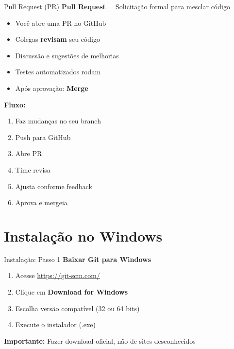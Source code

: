 \documentclass[11pt]{beamer}
\begin{document}
\begin{frame}{Pull Request (PR)}
\textbf{Pull Request} = Solicitação formal para mesclar código

\begin{itemize}
    \item Você abre uma PR no GitHub
    \item Colegas \textbf{revisam} seu código
    \item Discussão e sugestões de melhorias
    \item Testes automatizados rodam
    \item Após aprovação: \textbf{Merge}
\end{itemize}

\vspace{0.5cm}

\textbf{Fluxo:}
\begin{enumerate}
    \small
    \item Faz mudanças no seu branch
    \item Push para GitHub
    \item Abre PR
    \item Time revisa
    \item Ajusta conforme feedback
    \item Aprova e mergeia
\end{enumerate}
\end{frame}

\section{Instalação no Windows}

\begin{frame}{Instalação: Passo 1}
\textbf{Baixar Git para Windows}

\begin{enumerate}
    \item Acesse \url{https://git-scm.com/}
    \item Clique em \textbf{Download for Windows}
    \item Escolha versão compatível (32 ou 64 bits)
    \item Execute o instalador (.exe)
\end{enumerate}

\vspace{0.5cm}

\begin{center}
    \textbf{Importante:} Fazer download oficial, não de sites desconhecidos
\end{center}
\end{frame}
\end{document}
